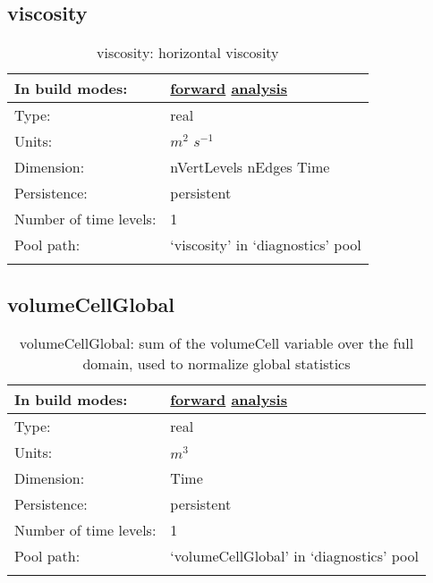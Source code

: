\subsection[viscosity]{viscosity}
\label{subsec:var_sec_diagnostics_viscosity}
\begin{center}
\begin{longtable}{| p{2.0in} | p{4.0in} |}
        \hline 
        In build modes: & \hyperref[subsec:forward_var_tab_diagnostics]{forward} \hyperref[subsec:analysis_var_tab_diagnostics]{analysis} \\
        \hline 
        Type: & real \\
        \hline 
        Units: & $m^2$ $s^{-1}$ \\
        \hline 
        Dimension: & nVertLevels nEdges Time \\
        \hline 
        Persistence: & persistent \\
        \hline 
        Number of time levels: & 1 \\
        \hline 
            Pool path: & `viscosity' in `diagnostics' pool \\
		 \hline 
    \caption{viscosity: horizontal viscosity}
\end{longtable}
\end{center}
\subsection[volumeCellGlobal]{volumeCellGlobal}
\label{subsec:var_sec_diagnostics_volumeCellGlobal}
\begin{center}
\begin{longtable}{| p{2.0in} | p{4.0in} |}
        \hline 
        In build modes: & \hyperref[subsec:forward_var_tab_diagnostics]{forward} \hyperref[subsec:analysis_var_tab_diagnostics]{analysis} \\
        \hline 
        Type: & real \\
        \hline 
        Units: & $m^3$ \\
        \hline 
        Dimension: & Time \\
        \hline 
        Persistence: & persistent \\
        \hline 
        Number of time levels: & 1 \\
        \hline 
            Pool path: & `volumeCellGlobal' in `diagnostics' pool \\
		 \hline 
    \caption{volumeCellGlobal: sum of the volumeCell variable over the full domain, used to normalize global statistics}
\end{longtable}
\end{center}
